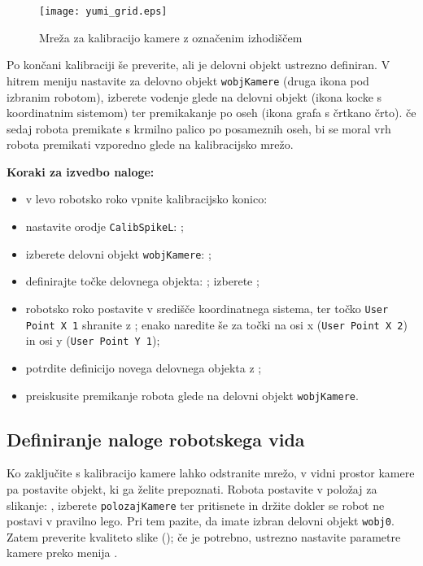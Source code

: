 \begin{figure}[!t]
	\centering
	\texttt{[image: yumi\_grid.eps]}
	\caption{Mreža za kalibracijo kamere z označenim izhodiščem}
	\label{fig:yumi_grid}
\end{figure}

Po končani kalibraciji še preverite, ali je delovni objekt ustrezno definiran. V hitrem meniju nastavite za delovno objekt \verb"wobjKamere" (druga ikona pod izbranim robotom), izberete vodenje glede na delovni objekt (ikona kocke s koordinatnim sistemom) ter premikakanje po oseh (ikona grafa s črtkano črto). če sedaj robota premikate s krmilno palico po posameznih oseh, bi se moral vrh robota premikati vzporedno glede na kalibracijsko mrežo.

\vspace{5mm}
\begin{mdframed}[backgroundcolor=yellow!20, shadow=true,roundcorner=8pt]
	\textbf{Koraki za izvedbo naloge:}
	\begin{itemize}
		\item v levo robotsko roko vpnite kalibracijsko konico: 
		\item nastavite orodje \verb"CalibSpikeL": ;
		\item izberete delovni objekt \verb"wobjKamere": ;
		\item definirajte točke delovnega objekta: ; izberete ;
		\item robotsko roko postavite v središče koordinatnega sistema, ter točko \verb"User Point X 1" shranite z ; enako naredite še za točki na osi x (\verb"User Point X 2") in osi y (\verb"User Point Y 1");
		\item potrdite definicijo novega delovnega objekta z ;
		\item preiskusite premikanje robota glede na delovni objekt \verb"wobjKamere".
	\end{itemize}
\end{mdframed}

\subsection{Definiranje naloge robotskega vida}
\label{ch:vision_job}

Ko zaključite s kalibracijo kamere lahko odstranite mrežo, v vidni prostor kamere pa postavite objekt, ki ga želite prepoznati. Robota postavite v položaj za slikanje: , izberete \verb"polozajKamere" ter pritisnete in držite  dokler se robot ne postavi v pravilno lego. Pri tem pazite, da imate izbran delovni objekt \verb"wobj0". Zatem preverite kvaliteto slike (); če je potrebno, ustrezno nastavite parametre kamere preko menija .

